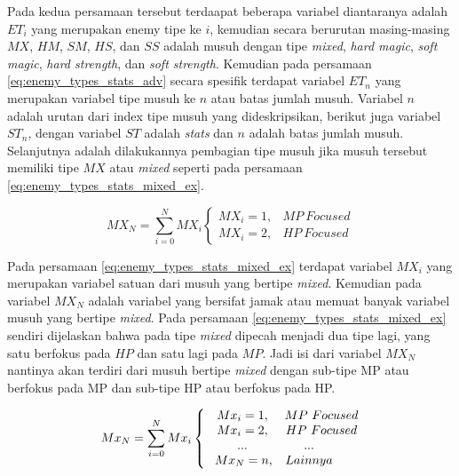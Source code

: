 Pada kedua persamaan tersebut terdaapat beberapa variabel diantaranya adalah $ET_{i}$ yang merupakan enemy tipe ke $i$, kemudian secara berurutan masing-masing $MX$, $HM$, $SM$, $HS$, dan $SS$ adalah musuh dengan tipe \textit{mixed}, \textit{hard magic}, \textit{soft magic}, \textit{hard strength}, dan \textit{soft strength}. Kemudian pada persamaan \ref{eq:enemy_types_stats_adv} secara spesifik terdapat variabel $ET_{n}$ yang merupakan variabel tipe musuh ke $n$ atau batas jumlah musuh. Variabel $n$ adalah urutan dari index tipe musuh yang dideskripsikan, berikut juga variabel $ST_{n}$, dengan variabel $ST$ adalah \textit{stats} dan $n$ adalah batas jumlah musuh. Selanjutnya adalah dilakukannya pembagian tipe musuh jika musuh tersebut memiliki tipe $MX$ atau \textit{mixed} seperti pada persamaan \ref{eq:enemy_types_stats_mixed_ex}.
\vspace{1ex}

\begin{equation}\label{eq:enemy_types_stats_mixed_ex}
MX_{N} = \sum_{i= 0}^{N} MX_{i} \left\{\begin{matrix}
MX_{i} = 1, & MP\ Focused\\
MX_{i} = 2, & HP\ Focused
\end{matrix}\right.
\end{equation}

Pada persamaan \ref{eq:enemy_types_stats_mixed_ex} terdapat variabel $MX_{i}$ yang merupakan variabel satuan dari musuh yang bertipe \textit{mixed}. Kemudian pada variabel $MX_{N}$ adalah variabel yang bersifat jamak atau memuat banyak variabel musuh yang bertipe \textit{mixed}. Pada persamaan \ref{eq:enemy_types_stats_mixed_ex} sendiri dijelaskan bahwa pada tipe \textit{mixed} dipecah menjadi dua tipe lagi, yang satu berfokus pada $HP$ dan satu lagi pada $MP$. Jadi isi dari variabel $MX_{N}$ nantinya akan terdiri dari musuh bertipe \textit{mixed} dengan sub-tipe MP atau berfokus pada MP dan sub-tipe HP atau berfokus pada HP.

\begin{equation}\label{eq:enemy_types_stats_mixed_adv}
Mx_{N} = \sum_{i= 0}^{N} Mx_{i} \left\{\begin{matrix}
\hspace{0.6em} Mx_{i} = 1, & MP\ Focused\\
\hspace{0.6em} Mx_{i} = 2, & HP\ Focused\\
\hspace{0.6em} ... & \hspace{-2.0em} ... \\
\hspace{0.8em} Mx_{N} = n, & \hspace{-2.0em} Lainnya\\
\end{matrix}\right.
\end{equation}

